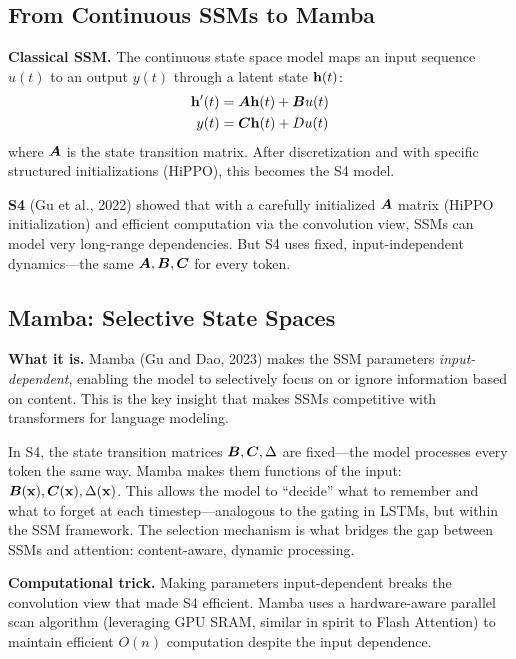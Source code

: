 \subsection{From Continuous SSMs to Mamba}

\textbf{Classical SSM.} The continuous state space model maps an input sequence $u(t)$ to an output $y(t)$ through a latent state $\mathbf{h}(t)$:
\begin{align}
\mathbf{h}'(t) &= \bm{A}\mathbf{h}(t) + \bm{B} u(t) \notag \\
y(t) &= \bm{C}\mathbf{h}(t) + D u(t) \notag
\end{align}
where $\bm{A}$ is the state transition matrix. After discretization and with specific structured initializations (HiPPO), this becomes the S4 model.

\textbf{S4} (Gu et al., 2022) showed that with a carefully initialized $\bm{A}$ matrix (HiPPO initialization) and efficient computation via the convolution view, SSMs can model very long-range dependencies. But S4 uses fixed, input-independent dynamics---the same $\bm{A}, \bm{B}, \bm{C}$ for every token.

\subsection{Mamba: Selective State Spaces}

\textbf{What it is.} Mamba (Gu and Dao, 2023) makes the SSM parameters \textit{input-dependent}, enabling the model to selectively focus on or ignore information based on content. This is the key insight that makes SSMs competitive with transformers for language modeling.

\begin{keyinsight}
In S4, the state transition matrices $\bm{B}, \bm{C}, \Delta$ are fixed---the model processes every token the same way. Mamba makes them functions of the input: $\bm{B}(\mathbf{x}), \bm{C}(\mathbf{x}), \Delta(\mathbf{x})$. This allows the model to ``decide'' what to remember and what to forget at each timestep---analogous to the gating in LSTMs, but within the SSM framework. The selection mechanism is what bridges the gap between SSMs and attention: content-aware, dynamic processing.
\end{keyinsight}

\textbf{Computational trick.} Making parameters input-dependent breaks the convolution view that made S4 efficient. Mamba uses a hardware-aware parallel scan algorithm (leveraging GPU SRAM, similar in spirit to Flash Attention) to maintain efficient $O(n)$ computation despite the input dependence.

